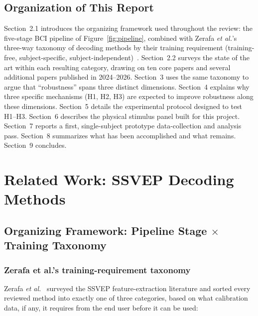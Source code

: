 \documentclass[11pt]{article}
\begin{document}
\subsection{Organization of This Report}

Section~2.1 introduces the organizing framework used throughout the review: the five-stage BCI pipeline of Figure~\ref{fig:pipeline}, combined with Zerafa \textit{et al.}'s three-way taxonomy of decoding methods by their training requirement (training-free, subject-specific, subject-independent)~\cite{zerafa2018train}. Section~2.2 surveys the state of the art within each resulting category, drawing on ten core papers and several additional papers published in 2024--2026. Section~3 uses the same taxonomy to argue that ``robustness'' spans three distinct dimensions. Section~4 explains why three specific mechanisms (H1, H2, H3) are expected to improve robustness along these dimensions. Section~5 details the experimental protocol designed to test H1--H3. Section~6 describes the physical stimulus panel built for this project. Section~7 reports a first, single-subject prototype data-collection and analysis pass. Section~8 summarizes what has been accomplished and what remains. Section~9 concludes.

\section{Related Work: SSVEP Decoding Methods}

\subsection{Organizing Framework: Pipeline Stage $\times$ Training Taxonomy}
\label{sec:framework}

\subsubsection{Zerafa et al.'s training-requirement taxonomy}

Zerafa \textit{et al.}~\cite{zerafa2018train} surveyed the SSVEP feature-extraction literature and sorted every reviewed method into exactly one of three categories, based on what calibration data, if any, it requires from the end user before it can be used:
\end{document}
